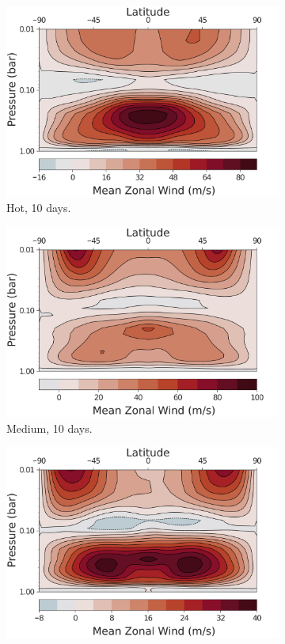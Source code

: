 \begin{figure}
  \centering
  \begin{subfigure}[b]{0.32\textwidth}
    \includegraphics[width=\textwidth]{figures/eqm-zonal-flow/wind-hot-10.pdf}
    \caption{Hot, 10 days.}
  \end{subfigure}
  \begin{subfigure}[b]{0.32\textwidth}
    \includegraphics[width=\textwidth]{figures/eqm-zonal-flow/wind-med-10.pdf}
    \caption{Medium, 10 days.}
  \end{subfigure}
  \begin{subfigure}[b]{0.32\textwidth}
    \includegraphics[width=\textwidth]{figures/eqm-zonal-flow/wind-cold-10.pdf}

\end{subfigure}
\end{figure}
